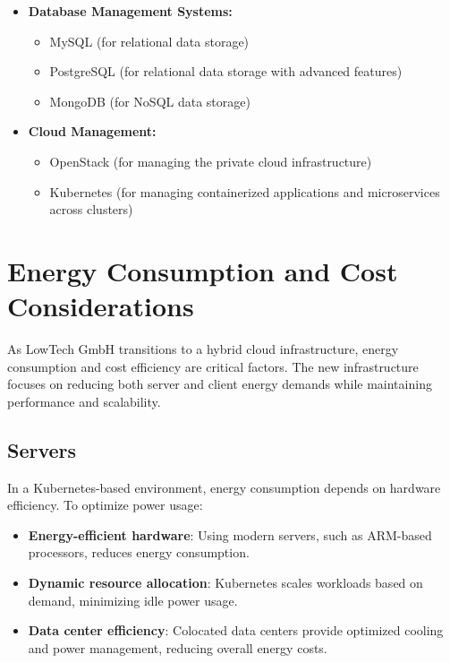 \begin{itemize}
\begin{itemize}
    \end{itemize}
    \item \textbf{Database Management Systems:}
    \begin{itemize}
        \item MySQL (for relational data storage)
        \item PostgreSQL (for relational data storage with advanced features)
        \item MongoDB (for NoSQL data storage)
    \end{itemize}
    \item \textbf{Cloud Management:}
    \begin{itemize}
        \item OpenStack (for managing the private cloud infrastructure)
        \item Kubernetes (for managing containerized applications and microservices across clusters)
    \end{itemize}
\end{itemize}


\section{Energy Consumption and Cost Considerations}

As LowTech GmbH transitions to a hybrid cloud infrastructure, energy consumption and cost efficiency are critical factors. The new infrastructure focuses on reducing both server and client energy demands while maintaining performance and scalability.

\subsection{Servers}

In a Kubernetes-based environment, energy consumption depends on hardware efficiency. To optimize power usage:
\begin{itemize}
    \item \textbf{Energy-efficient hardware}: Using modern servers, such as ARM-based processors, reduces energy consumption.
    \item \textbf{Dynamic resource allocation}: Kubernetes scales workloads based on demand, minimizing idle power usage.
    \item \textbf{Data center efficiency}: Colocated data centers provide optimized cooling and power management, reducing overall energy costs.
\end{itemize}

